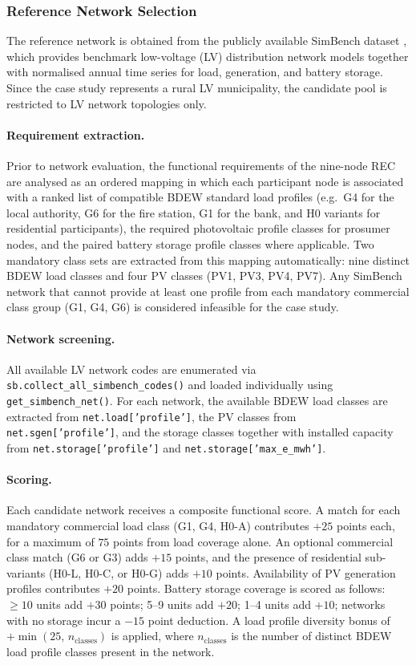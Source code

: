 \subsubsection*{Reference Network Selection}

The reference network is obtained from the publicly available SimBench dataset \cite{SarajlicRehtanz2019}, which provides benchmark low-voltage (LV) distribution network models together with normalised annual time series for load, generation, and battery storage. Since the case study represents a rural LV municipality, the candidate pool is restricted to LV network topologies only.

\paragraph{Requirement extraction.}
Prior to network evaluation, the functional requirements of the nine-node REC are analysed as an ordered mapping in which each participant node is associated with a ranked list of compatible BDEW standard load profiles (e.g.\ G4 for the local authority, G6 for the fire station, G1 for the bank, and H0 variants for residential participants), the required photovoltaic profile classes for prosumer nodes, and the paired battery storage profile classes where applicable. Two mandatory class sets are extracted from this mapping automatically: nine distinct BDEW load classes and four PV classes (PV1, PV3, PV4, PV7). Any SimBench network that cannot provide at least one profile from each mandatory commercial class group (G1, G4, G6) is considered infeasible for the case study.

\paragraph{Network screening.}
All available LV network codes are enumerated via \texttt{sb.collect\_all\_simbench\_codes()} and loaded individually using \texttt{get\_simbench\_net()}. For each network, the available BDEW load classes are extracted from \texttt{net.load['profile']}, the PV classes from \texttt{net.sgen['profile']}, and the storage classes together with installed capacity from \texttt{net.storage['profile']} and \texttt{net.storage['max\_e\_mwh']}.

\paragraph{Scoring.}
Each candidate network receives a composite functional score. A match for each mandatory commercial load class (G1, G4, H0-A) contributes $+25$ points each, for a maximum of $75$ points from load coverage alone. An optional commercial class match (G6 or G3) adds $+15$ points, and the presence of residential sub-variants (H0-L, H0-C, or H0-G) adds $+10$ points. Availability of PV generation profiles contributes $+20$ points. Battery storage coverage is scored as follows: $\geq10$ units add $+30$ points; 5--9 units add $+20$; 1--4 units add $+10$; networks with no storage incur a $-15$ point deduction. A load profile diversity bonus of $+\min(25,\,n_{\mathrm{classes}})$ is applied, where $n_{\mathrm{classes}}$ is the number of distinct BDEW load profile classes present in the network.

